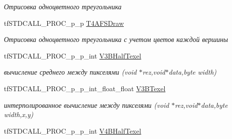 \begin{DoxyCompactItemize}
\begin{DoxyCompactList}\small\item\em Отрисовка одноцветного треугольника \end{DoxyCompactList}\item 
\hypertarget{structs_functions_render_c_p_u_afaeb45fb6a3e5155005c560b7865ae52}{tf\-S\-T\-D\-C\-A\-L\-L\-\_\-\-P\-R\-O\-C\-\_\-p\-\_\-p \hyperlink{structs_functions_render_c_p_u_afaeb45fb6a3e5155005c560b7865ae52}{T4\-A\-F\-S\-Draw}}\label{structs_functions_render_c_p_u_afaeb45fb6a3e5155005c560b7865ae52}

\begin{DoxyCompactList}\small\item\em Отрисовка одноцветного треугольника с учетом цветов каждой вершины \end{DoxyCompactList}\item 
\hypertarget{structs_functions_render_c_p_u_a4a03e3921435f5fbebb832c5fcd8d145}{tf\-S\-T\-D\-C\-A\-L\-L\-\_\-\-P\-R\-O\-C\-\_\-p\-\_\-p\-\_\-int \hyperlink{structs_functions_render_c_p_u_a4a03e3921435f5fbebb832c5fcd8d145}{V3\-B\-Half\-Texel}}\label{structs_functions_render_c_p_u_a4a03e3921435f5fbebb832c5fcd8d145}

\begin{DoxyCompactList}\small\item\em вычисление среднего между пикселями (void $\ast$rez,void$\ast$data,byte width) \end{DoxyCompactList}\item 
\hypertarget{structs_functions_render_c_p_u_a56d5ddbfc3b3a8f683a951f43d463a31}{tf\-S\-T\-D\-C\-A\-L\-L\-\_\-\-P\-R\-O\-C\-\_\-p\-\_\-p\-\_\-int\-\_\-float\-\_\-float \hyperlink{structs_functions_render_c_p_u_a56d5ddbfc3b3a8f683a951f43d463a31}{V3\-B\-Texel}}\label{structs_functions_render_c_p_u_a56d5ddbfc3b3a8f683a951f43d463a31}

\begin{DoxyCompactList}\small\item\em интерполированное вычисление между пикселями (void $\ast$rez,void$\ast$data,byte width,x,y) \end{DoxyCompactList}\item 
\hypertarget{structs_functions_render_c_p_u_a76e6e9cbe28a01808b23600874eccc6f}{tf\-S\-T\-D\-C\-A\-L\-L\-\_\-\-P\-R\-O\-C\-\_\-p\-\_\-p\-\_\-int \hyperlink{structs_functions_render_c_p_u_a76e6e9cbe28a01808b23600874eccc6f}{V4\-B\-Half\-Texel}}\label{structs_functions_render_c_p_u_a76e6e9cbe28a01808b23600874eccc6f}


\end{DoxyCompactItemize}
